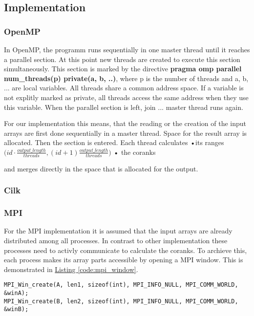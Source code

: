 \subsection{Implementation}

\subsubsection{OpenMP}
In OpenMP, the programm runs sequentially in one master thread until it reaches a parallel section.
At this point new threads are created to execute this section simultaneously.
This section is marked by the directive \textbf{pragma omp parallel num\_threads(p) private(a, b, ..)}, where p is the number of threads and a, b, ... are local variables.
All threads share a common address space.
If a variable is not explitly marked as private, all threads access the same address when they use this variable.
When the parallel section is left, join ... master thread runs again.

For our implementation this means, that the reading or the creation of the input arrays are first done sequentially in a master thread.
Space for the result array is allocated.
Then the section is entered.
Each thread calculates
•its ranges
$\big(id \cdot \frac{output\_length}{threads}, (id+1)\frac{output\_length}{threads}\big)$
• the coranks

and merges directly in the space that is allocated for the output.



\subsubsection{Cilk}

\subsubsection{MPI}
For the MPI implementation it is assumed that the input arrays are already distributed among all processes.
In contrast to other implementation these processes need to activly communicate to calculate the coranks.
To archieve this, each process makes its array parts accessible by opening a MPI window.
This is demonstrated in \hyperref[code:mpi_window]{Listing \ref*{code:mpi_window}}.

\begin{lstlisting}[caption=window to share arrays, label=code:mpi_window,style=c]
MPI_Win_create(A, len1, sizeof(int), MPI_INFO_NULL, MPI_COMM_WORLD, &winA);
MPI_Win_create(B, len2, sizeof(int), MPI_INFO_NULL, MPI_COMM_WORLD, &winB);
\end{lstlisting}

